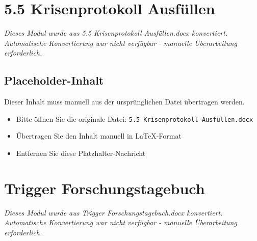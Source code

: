 


\section{5.5 Krisenprotokoll Ausfüllen}
\label{sec:5.5-krisenprotokoll-ausfüllen}

\begin{center}
\textit{Dieses Modul wurde aus 5.5 Krisenprotokoll Ausfüllen.docx konvertiert.\\
Automatische Konvertierung war nicht verfügbar - manuelle Überarbeitung erforderlich.}
\end{center}


\subsection{Placeholder-Inhalt}

Dieser Inhalt muss manuell aus der ursprünglichen Datei übertragen werden.

\begin{itemize}
\item Bitte öffnen Sie die originale Datei: \texttt{5.5 Krisenprotokoll Ausfüllen.docx}
\item Übertragen Sie den Inhalt manuell in LaTeX-Format
\item Entfernen Sie diese Platzhalter-Nachricht
\end{itemize}




\section{Trigger Forschungstagebuch}
\label{sec:trigger-forschungstagebuch}

\begin{center}
\textit{Dieses Modul wurde aus Trigger Forschungstagebuch.docx konvertiert.\\
Automatische Konvertierung war nicht verfügbar - manuelle Überarbeitung erforderlich.}
\end{center}


